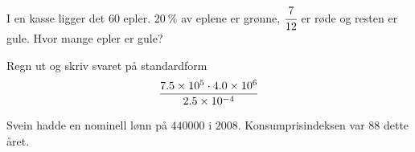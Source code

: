 %


\Oppgave[2] 

I en kasse ligger det $60$ epler. $\SI{20}{\percent}$ av eplene er grønne,
$\cfrac{7}{12}$ er røde og resten er gule. Hvor mange epler er gule?


\Oppgave[2] 

Regn ut og skriv svaret på standardform
%
\begin{equation*}
  \frac{\num{7.5E5} \cdot \num{4.0E6}}{\num{2.5E-4}}
\end{equation*}


\Oppgave[2] 

Svein hadde en nominell lønn på $\num{440 000}$ i $2008$. Konsumprisindeksen var
$88$ dette året.  \bigskip\noindent

